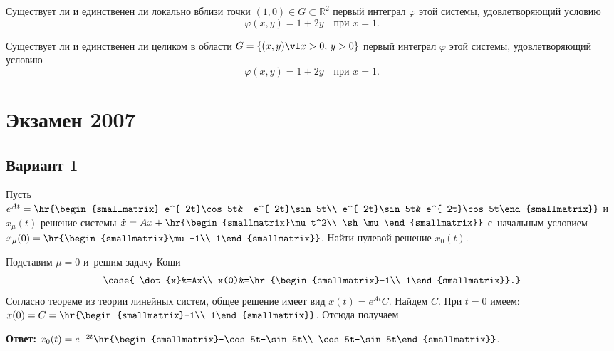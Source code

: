 \documentclass{article}
\begin{document}
\begin{problem}[1 балл]
Существует ли и единственен ли локально вблизи точки $(1,0)\in G\subset\mathbb{R}^2$
первый интеграл $\varphi$ этой системы, удовлетворяющий условию
$$\varphi(x,y)=1+2y\quad\text{при $x=1$}.$$
\end{problem}

\begin{problem}[3 балла]
Существует ли и единственен ли целиком в области $G=\{(x,y)\vl  x>0,\,y>0\}$
первый интеграл $\varphi$ этой системы, удовлетворяющий условию
$$\varphi(x,y)=1+2y\quad\text{при $x=1$}.$$
\end{problem}

\section{Экзамен 2007}

\setcounter{problem}{0}
\subsection{Вариант 1}

\begin{problem}[1 балл]
Пусть $e^{At}=\hr{\begin{smallmatrix} e^{-2t}\cos 5t&
-e^{-2t}\sin 5t\\ e^{-2t}\sin 5t& e^{-2t}\cos
5t\end{smallmatrix}}$ и~$x_\mu(t)$ решение системы
$\dot{x}=Ax+\hr{\begin{smallmatrix}\mu t^2\\ \sh \mu\end{smallmatrix}}$ с~начальным условием
$x_\mu(0)=\hr{\begin{smallmatrix}\mu-1\\ 1\end{smallmatrix}}$.
Найти нулевой решение $x_0(t)$.
\end{problem}
\begin{solution}
Подставим $\mu=0$ и~решим задачу Коши
$$
\case{
\dot{x}&=Ax\\
x(0)&=\hr{\begin{smallmatrix}-1\\ 1\end{smallmatrix}}.}
$$
Согласно теореме из теории линейных систем, общее решение имеет вид
$x(t)=e^{At}C$. Найдем $C$. При $t=0$ имеем: $x(0)=C=\hr{\begin{smallmatrix}-1\\ 1\end{smallmatrix}}$.
Отсюда получаем

\textbf{Ответ:} $x_0(t)=e^{-2t}\hr{\begin{smallmatrix}-\cos 5t-\sin 5t\\ \cos 5t-\sin 5t\end{smallmatrix}}$.
\end{solution}
\end{document}
